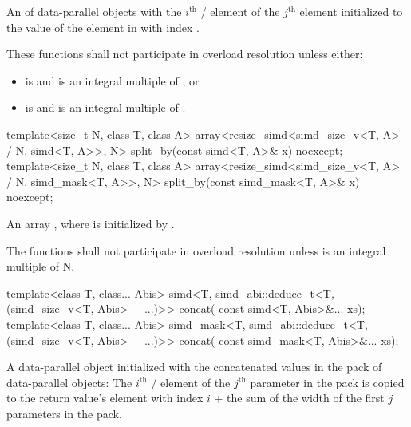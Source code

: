 \begin{itemdescr}
  \pnum\returns
  An  of data-parallel objects with the $i^\text{th}$ / element of the $j^\text{th}$  element initialized to the value of the element in  with index .

  \pnum\remarks
  These functions shall not participate in overload resolution unless either:
  \begin{itemize}
    \item {} is  and  is an integral multiple of , or
    \item {} is  and  is an integral multiple of .
  \end{itemize}
\end{itemdescr}

\begin{itemdecl}
template<size_t N, class T, class A>
  array<resize_simd<simd_size_v<T, A> / N, simd<T, A>>, N>
    split_by(const simd<T, A>& x) noexcept;
template<size_t N, class T, class A>
  array<resize_simd<simd_size_v<T, A> / N, simd_mask<T, A>>, N>
    split_by(const simd_mask<T, A>& x) noexcept;
\end{itemdecl}

\begin{itemdescr}
  \pnum\returns
  An array , where  is initialized by .

  \pnum\remarks
  The functions shall not participate in overload resolution unless  is an integral multiple of \tcode N.
\end{itemdescr}

\begin{itemdecl}
template<class T, class... Abis>
  simd<T, simd_abi::deduce_t<T, (simd_size_v<T, Abis> + ...)>> concat(
    const simd<T, Abis>&... xs);
template<class T, class... Abis>
  simd_mask<T, simd_abi::deduce_t<T, (simd_size_v<T, Abis> + ...)>> concat(
    const simd_mask<T, Abis>&... xs);
\end{itemdecl}

\begin{itemdescr}
  \pnum\returns
  A data-parallel object initialized with the concatenated values in the  pack of data-parallel objects: The $i^\text{th}$ / element of the $j^\text{th}$ parameter in the  pack is copied to the return value's element with index $i$ + the sum of the width of the first $j$ parameters in the  pack.
\end{itemdescr}

